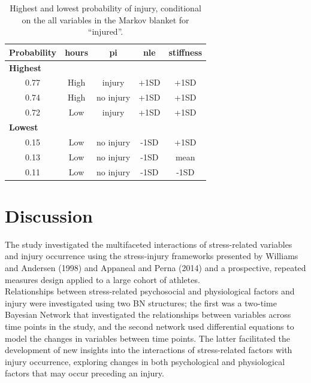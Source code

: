 \documentclass[
  english,
  man]{apa6}
\begin{document}
\begin{table}[H]

\caption{\label{tab:table10}Highest and lowest probability of injury, conditional on the all variables in the Markov blanket for ``injured''.}
\centering
\begin{tabular}[t]{c|c|c|c|c}
\hline
\textbf{Probability} & \textbf{hours} & \textbf{pi} & \textbf{nle} & \textbf{stiffness}\\
\hline
\multicolumn{5}{l}{\textbf{Highest}}\\
\hline
\hspace{1em}0.77 & High & injury & +1SD & +1SD\\
\hline
\hspace{1em}0.74 & High & no injury & +1SD & +1SD\\
\hline
\hspace{1em}0.72 & Low & injury & +1SD & +1SD\\
\hline
\multicolumn{5}{l}{\textbf{Lowest}}\\
\hline
\hspace{1em}0.15 & Low & no injury & -1SD & +1SD\\
\hline
\hspace{1em}0.13 & Low & no injury & -1SD & mean\\
\hline
\hspace{1em}0.11 & Low & no injury & -1SD & -1SD\\
\hline
\end{tabular}
\end{table}

\hypertarget{discussion}{%
\section{Discussion}\label{discussion}}

The study investigated the multifaceted interactions of stress-related variables and injury occurrence using the stress-injury frameworks presented by Williams and Andersen (1998) and Appaneal and Perna (2014) and a prospective, repeated measures design applied to a large cohort of athletes.\\
Relationships between stress-related psychosocial and physiological factors and injury were investigated using two BN structures; the first was a two-time Bayesian Network that investigated the relationships between variables across time points in the study, and the second network used differential equations to model the changes in variables between time points.
The latter facilitated the development of new insights into the interactions of stress-related factors with injury occurrence, exploring changes in both psychological and physiological factors that may occur preceding an injury.
\end{document}
